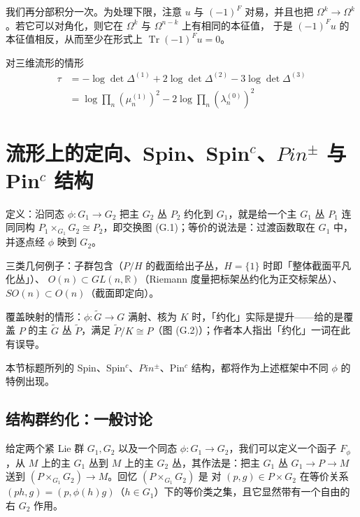 我们再分部积分一次。为处理下限，注意 $u$ 与 $(-1)^F$ 对易，并且也把
$\Omega^k\to\Omega^k$。若它可以对角化，则它在 $\Omega^k$ 与 $\Omega^{n-k}$ 上有相同的本征值，
于是 $(-1)^F u$ 的本征值相反，从而至少在形式上 $\operatorname{Tr}(-1)^F u = 0$。

对三维流形的情形
\begin{equation}
\begin{aligned}
  \tau &= -\log\det\Delta^{(1)} + 2\log\det\Delta^{(2)} - 3\log\det\Delta^{(3)}\\
  &= \log\prod_n(\mu_n^{(1)})^2 - 2\log\prod_n(\lambda_n^{(0)})^2
\end{aligned}
\tag{F.21}
\label{eq:F.21}
\end{equation}

\section{流形上的定向、Spin、Spin$^c$、$Pin^{\pm}$ 与 Pin$^c$ 结构} %

\begin{keytakeaways}
  \item 定义：沿同态 $\phi:G_1\to G_2$ 把主 $G_2$ 丛 $P_2$ 约化到 $G_1$，就是给一个主 $G_1$ 丛 $P_1$
    连同同构 $P_1\times_{G_1}G_2\cong P_2$，即交换图 (G.1)；等价的说法是：过渡函数取在 $G_1$ 中，
    并逐点经 $\phi$ 映到 $G_2$。
  \item 三类几何例子：子群包含（$P/H$ 的截面给出子丛，$H=\{1\}$ 时即「整体截面平凡化丛」）、
    $O(n)\subset GL(n,\mathbb{R})$（Riemann 度量把标架丛约化为正交标架丛）、
    $SO(n)\subset O(n)$（截面即定向）。
  \item 覆盖映射的情形：$\phi:\tilde G\to G$ 满射、核为 $K$ 时，「约化」实际是提升——给的是覆盖 $P$
    的主 $\tilde G$ 丛 $\tilde P$，满足 $\tilde P/K\cong P$（图 (G.2)）；作者本人指出「约化」一词在此有误导。
  \item 本节标题所列的 Spin、Spin$^c$、$Pin^{\pm}$、Pin$^c$ 结构，都将作为上述框架中不同 $\phi$ 的特例出现。
\end{keytakeaways}

\subsection{结构群约化：一般讨论} %

给定两个紧 Lie 群 $G_1,G_2$ 以及一个同态 $\phi:G_1\to G_2$，我们可以定义一个函子 $F_\phi$，从 $M$ 上的主 $G_1$ 丛到 $M$ 上的主 $G_2$ 丛，其作法是：把主 $G_1$ 丛 $G_1\to P\to M$ 送到 $(P\times_{G_1}G_2)\to M$。回忆 $(P\times_{G_1}G_2)$ 是
对 $(p,g)\in P\times G_2$ 在等价关系 $(ph,g) = (p,\phi(h)g)$（$h\in G_1$）下的等价类之集，且它显然带有一个自由的右 $G_2$ 作用。

